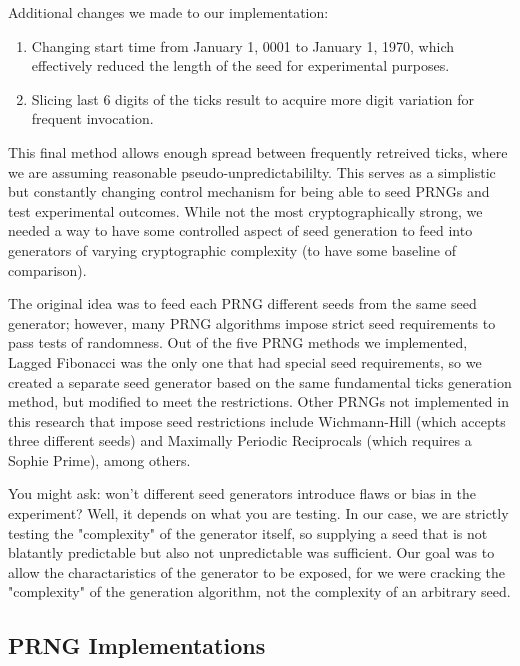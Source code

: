 \documentclass[conference]{IEEEtran}
\begin{document}
Additional changes we made to our implementation:
\begin{enumerate}
    \item Changing start time from January 1, 0001 to January 1, 1970, which effectively reduced the length of the seed for experimental purposes.
    \item Slicing last 6 digits of the ticks result to acquire more digit variation for frequent invocation.
\end{enumerate}

This final method allows enough spread between frequently retreived ticks, where we are assuming reasonable pseudo-unpredictabililty. This serves as a simplistic but constantly changing control mechanism for being able to seed PRNGs and test experimental outcomes. While not the most cryptographically strong, we needed a way to have some controlled aspect of seed generation to feed into generators of varying cryptographic complexity (to have some baseline of comparison).\newline

The original idea was to feed each PRNG different seeds from the same seed generator; however, many PRNG algorithms impose strict seed requirements to pass tests of randomness. Out of the five PRNG methods we implemented, Lagged Fibonacci was the only one that had special seed requirements, so we created a separate seed generator based on the same fundamental ticks generation method, but modified to meet the restrictions. Other PRNGs not implemented in this research that impose seed restrictions include Wichmann-Hill (which accepts three different seeds) and Maximally Periodic Reciprocals (which requires a Sophie Prime), among others.\newline

You might ask: won't different seed generators introduce flaws or bias in the experiment? Well, it depends on what you are testing. In our case, we are strictly testing the "complexity" of the generator itself, so supplying a seed that is not blatantly predictable but also not unpredictable was sufficient. Our goal was to allow the charactaristics of the generator to be exposed, for we were cracking the "complexity" of the generation algorithm, not the complexity of an arbitrary seed.

\subsection{PRNG Implementations}
\end{document}
